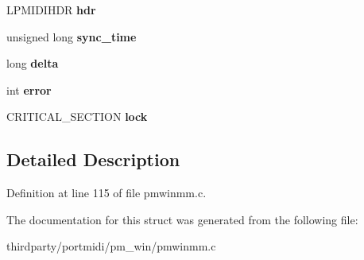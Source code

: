 \begin{DoxyCompactItemize}
\item 
\mbox{\label{structmidiwinmm__struct_a11e6f5498974be95186123e13507d798}} 
L\+P\+M\+I\+D\+I\+H\+DR {\bfseries hdr}
\item 
\mbox{\label{structmidiwinmm__struct_aacee5aeff23bb17834bf177a2e1e6f56}} 
unsigned long {\bfseries sync\+\_\+time}
\item 
\mbox{\label{structmidiwinmm__struct_a60acc42e195cf76af089519c6e573d72}} 
long {\bfseries delta}
\item 
\mbox{\label{structmidiwinmm__struct_a3eed174837c7451870164d583b642d01}} 
int {\bfseries error}
\item 
\mbox{\label{structmidiwinmm__struct_af5deb1b5de786de9aa215ed4bec4d6e6}} 
C\+R\+I\+T\+I\+C\+A\+L\+\_\+\+S\+E\+C\+T\+I\+ON {\bfseries lock}
\end{DoxyCompactItemize}


\subsection{Detailed Description}


Definition at line 115 of file pmwinmm.\+c.



The documentation for this struct was generated from the following file\+:\begin{DoxyCompactItemize}
\item 
thirdparty/portmidi/pm\+\_\+win/pmwinmm.\+c\end{DoxyCompactItemize}

